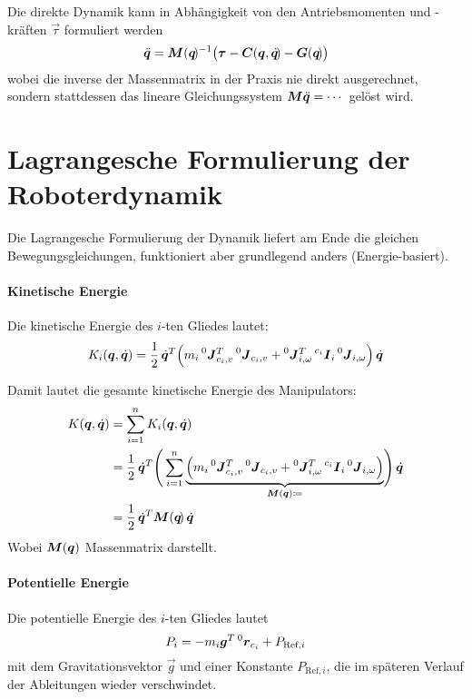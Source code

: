 			Die direkte Dynamik \DIRDYN kann in Abhängigkeit von den Antriebsmomenten und -kräften \(\vec{\tau}\) formuliert werden
			\begin{equation*}
				\ddot{\bm{q}} = \bm{M}(\bm{q}\!)^{-1} \big( \bm{\tau} - \bm{C}(\bm{q}, \dot{\bm{q}}\!) - \bm{G}(\bm{q}\!) \big)
			\end{equation*}
			wobei die inverse der Massenmatrix in der Praxis nie direkt ausgerechnet, sondern stattdessen das lineare Gleichungssystem \( \bm{M} \ddot{\bm{q}} = \cdots \) gelöst wird.

	\section{Lagrangesche Formulierung der Roboterdynamik}
		Die Lagrangesche Formulierung der Dynamik liefert am Ende die gleichen Bewegungsgleichungen, funktioniert aber grundlegend anders (Energie-basiert).

		\paragraph{Kinetische Energie}
			Die kinetische Energie des \(i\)-ten Gliedes lautet:
			\begin{equation*}
				K_i(\bm{q}, \dot{\bm{q}}) = \frac{1}{2}\, \dot{\bm{q}}^T \Big( m_i \prescript{0}{}{\bm{J}}_{c_i, v}^T \prescript{0}{}{\bm{J}}_{c_i, v} + \prescript{0}{}{\bm{J}}_{i, \omega}^T \prescript{c_i}{}{\bm{I}}_i \prescript{0}{}{\bm{J}}_{i, \omega} \Big)\, \dot{\bm{q}}
			\end{equation*}

			Damit lautet die gesamte kinetische Energie des Manipulators:
			\begin{align*}
				K(\bm{q}, \dot{\bm{q}}) &= \sum_{i = 1}^{n} K_i(\bm{q}, \dot{\bm{q}}) \\
					&= \frac{1}{2} \, \dot{\bm{q}}^T \Bigg( \sum_{i = 1}^{n} \underbrace{\Big( m_i \prescript{0}{}{\bm{J}}_{c_i, v}^T \prescript{0}{}{\bm{J}}_{c_i, v} + \prescript{0}{}{\bm{J}}_{i, \omega}^T \prescript{c_i}{}{\bm{I}}_i \prescript{0}{}{\bm{J}}_{i, \omega} \Big)}_{\bm{M}(\bm{q}) \coloneqq} \! \Bigg)\, \dot{\bm{q}} \\
					&= \frac{1}{2} \, \dot{\bm{q}}^T \bm{M}(\bm{q}\!)\, \dot{\bm{q}}
			\end{align*}
			Wobei \( \bm{M}(\bm{q}) \) Massenmatrix darstellt.

		\paragraph{Potentielle Energie}
			Die potentielle Energie des \(i\)-ten Gliedes lautet
			\begin{equation*}
				P_i = -m_i \bm{g}^T \prescript{0}{}{\bm{r}}_{c_i} + P_{\text{Ref}, i}
			\end{equation*}
			mit dem Gravitationsvektor \( \vec{g} \) und einer Konstante \( P_{\text{Ref}, i} \), die im späteren Verlauf der Ableitungen wieder verschwindet.

